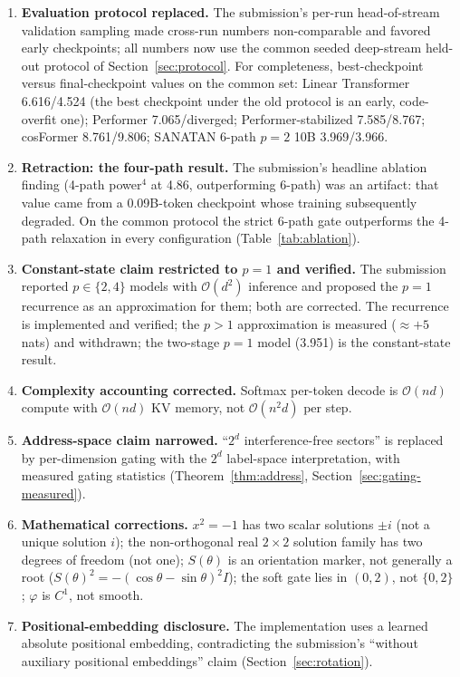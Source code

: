 \documentclass{article}
\newcommand{\cO}{\mathcal{O}}
\begin{document}
\begin{enumerate}
\item \textbf{Evaluation protocol replaced.} The submission's per-run head-of-stream validation sampling made cross-run numbers non-comparable and favored early checkpoints; all numbers now use the common seeded deep-stream held-out protocol of Section~\ref{sec:protocol}. For completeness, best-checkpoint versus final-checkpoint values on the common set: Linear Transformer 6.616/4.524 (the best checkpoint under the old protocol is an early, code-overfit one); Performer 7.065/diverged; Performer-stabilized 7.585/8.767; cosFormer 8.761/9.806; SANATAN 6-path $p{=}2$ 10B 3.969/3.966.
\item \textbf{Retraction: the four-path result.} The submission's headline ablation finding (4-path power$^4$ at 4.86, outperforming 6-path) was an artifact: that value came from a 0.09B-token checkpoint whose training subsequently degraded. On the common protocol the strict 6-path gate outperforms the 4-path relaxation in every configuration (Table~\ref{tab:ablation}).
\item \textbf{Constant-state claim restricted to $p{=}1$ and verified.} The submission reported $p \in \{2,4\}$ models with $\cO(d^2)$ inference and proposed the $p{=}1$ recurrence as an approximation for them; both are corrected. The recurrence is implemented and verified; the $p{>}1$ approximation is measured ($\approx{+}5$ nats) and withdrawn; the two-stage $p{=}1$ model (3.951) is the constant-state result.
\item \textbf{Complexity accounting corrected.} Softmax per-token decode is $\cO(nd)$ compute with $\cO(nd)$ KV memory, not $\cO(n^2 d)$ per step.
\item \textbf{Address-space claim narrowed.} ``$2^d$ interference-free sectors'' is replaced by per-dimension gating with the $2^d$ label-space interpretation, with measured gating statistics (Theorem~\ref{thm:address}, Section~\ref{sec:gating-measured}).
\item \textbf{Mathematical corrections.} $x^2=-1$ has two scalar solutions $\pm i$ (not a unique solution $i$); the non-orthogonal real $2\times2$ solution family has two degrees of freedom (not one); $S(\theta)$ is an orientation marker, not generally a root ($S(\theta)^2 = -(\cos\theta-\sin\theta)^2 I$); the soft gate lies in $(0,2)$, not $\{0,2\}$; $\varphi$ is $C^1$, not smooth.
\item \textbf{Positional-embedding disclosure.} The implementation uses a learned absolute positional embedding, contradicting the submission's ``without auxiliary positional embeddings'' claim (Section~\ref{sec:rotation}).

\end{enumerate}
\end{document}
